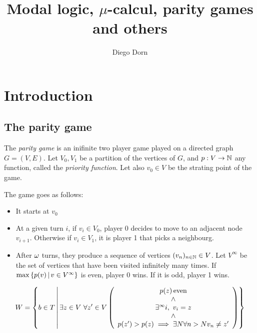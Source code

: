 

\title{Modal logic, $\mu$-calcul, parity games and others}
\author{Diego Dorn}


    \maketitle

    \section{Introduction}

    \subsection{The parity game}
    \begin{definition}
        The \emph{parity game} is an inifinite two player game
        played on a directed graph $G = (V, E)$. Let $V_0, V_1$
        be a partition of the vertices of $G$, and $p: V \to \mathbb N$
        any function, called the \emph{priority function}.
        Let also $v_0 \in V$ be the strating point of the game.

        The game goes as follows: 
        \begin{itemize}
            \item It starts at $v_0$
            \item At a given turn $i$, if $v_i \in V_0$,
                player 0 decides to move to an adjacent node 
                $v_{i+1}$. Otherwise if $v_i \in V_1$, it is 
                player 1 that picks a neighbourg.
            \item After $\omega$ turns, they produce a sequence of vertices 
                $(v_n)_{n \in \mathbb N} \in V$. Let $V^\infty$ be the set of
                vertices that have been visited infinitely many times.
                If $\max \left\{ p(v) \, \middle| \, v \in V^\infty \right\}$ is even, player 0 
                wins. If it is odd, player 1 wins.
        \end{itemize}

    \end{definition}

    \[  
        W = \left\{ b \in T \, \middle| \, 
            \exists z \in V ~ \forall z' \in V \left(
                \begin{array}{c}
                    p(z) \operatorname{even}
                    \\ \wedge \\
                    \exists^\infty i,~ v_i = z
                    \\ \wedge \\
                    p(z') > p(z) \implies \exists N \forall n > N v_n \neq z'
                \end{array}
            \right)
         \right\}
    \]
